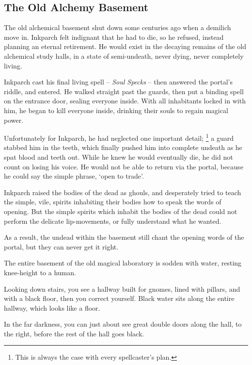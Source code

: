 \subsection{The Old Alchemy Basement}
\label{old_alchemy_basement}

\begin{exampletext}
  The old alchemical basement shut down some centuries ago when a demilich move in.
  Inkparch felt indignant that he had to die, so he refused, instead planning an eternal retirement.
  He would exist in the decaying remains of the old alchemical study halls, in a state of semi-undeath, never dying, never completely living.

  Inkparch cast his final living spell -- \textit{Soul Specks} -- then answered the portal's riddle, and entered.
  He walked straight past the guards, then put a binding spell on the entrance door, sealing everyone inside.
  With all inhabitants locked in with him, he began to kill everyone inside, drinking their souls to regain magical power.

  Unfortunately for Inkparch, he had neglected one important detail;%
  \footnote{This is always the case with every spellcaster's plan.}
  a guard stabbed him in the teeth, which finally pushed him into complete undeath as he spat blood and teeth out.
  While he knew he would eventually die, he did not count on losing his voice.
  He would not be able to return via the portal, because he could say the simple phrase, `open to trade'.

  Inkparch raised the bodies of the dead as ghouls, and desperately tried to teach the simple, vile, spirits inhabiting their bodies how to speak the words of opening.
  But the simple spirits which inhabit the bodies of the dead could not perform the delicate lip-movements, or fully understand what he wanted.

  As a result, the undead within the basement still chant the opening words of the portal, but they can never get it right.
\end{exampletext}

The entire basement of the old magical laboratory is sodden with water, resting knee-height to a human.

\begin{boxtext}
  Looking down stairs, you see a hallway built for gnomes, lined with pillars, and with a black floor, then you correct yourself.
  Black water sits along the entire hallway, which looks like a floor.

  In the far darkness, you can just about see great double doors along the hall, to the right, before the rest of the hall goes black.

\end{boxtext}

